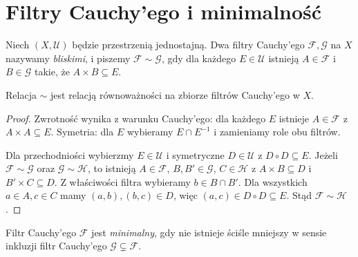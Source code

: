 \section{Filtry Cauchy'ego i minimalność}
\label{sec:topog-uzupelnienia-filtry}

\begin{definicja}
\label{def:topog-uzupelnienia-bliskie}
Niech $(X,\mathcal U)$ będzie przestrzenią
jednostajną. Dwa filtry Cauchy'ego
$\mathcal F,\mathcal G$ na $X$ nazywamy
\emph{bliskimi}, i piszemy $\mathcal F\sim\mathcal G$,
gdy dla każdego $E\in\mathcal U$
istnieją $A\in\mathcal F$ i $B\in\mathcal G$
takie, że $A\times B\subseteq E$.
\end{definicja}

\begin{lemat}
\label{lem:topog-uzupelnienia-rownowaznosc}
Relacja $\sim$ jest relacją równoważności
na zbiorze filtrów Cauchy'ego w $X$.
\end{lemat}
\begin{proof}
Zwrotność wynika z warunku Cauchy'ego:
dla każdego $E$ istnieje $A\in\mathcal F$
z $A\times A\subseteq E$.
Symetria: dla $E$ wybieramy $E\cap E^{-1}$
i zamieniamy role obu filtrów.

Dla przechodniości wybierzmy $E\in\mathcal U$
i symetryczne $D\in\mathcal U$ z
$D\circ D\subseteq E$. Jeżeli
$\mathcal F\sim\mathcal G$ oraz
$\mathcal G\sim\mathcal H$, to istnieją
$A\in\mathcal F$, $B,B'\in\mathcal G$,
$C\in\mathcal H$ z $A\times B\subseteq D$
i $B'\times C\subseteq D$.
Z właściwości filtra wybieramy
$b\in B\cap B'$. Dla wszystkich
$a\in A,c\in C$ mamy $(a,b),(b,c)\in D$,
więc $(a,c)\in D\circ D\subseteq E$.
Stąd $\mathcal F\sim\mathcal H$.
\end{proof}

\begin{definicja}
\label{def:topog-uzupelnienia-minimalny}
Filtr Cauchy'ego $\mathcal F$ jest
\emph{minimalny}, gdy nie istnieje
ściśle mniejszy w sensie inkluzji
filtr Cauchy'ego $\mathcal G\subsetneq\mathcal F$.
\end{definicja}

